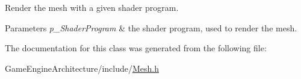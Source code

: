 Render the mesh with a given shader program. 


\begin{DoxyParams}{Parameters}
{\em p\+\_\+\+Shader\+Program} & the shader program, used to render the mesh. \\
\hline
\end{DoxyParams}


The documentation for this class was generated from the following file\+:\begin{DoxyCompactItemize}
\item 
Game\+Engine\+Architecture/include/\mbox{\hyperlink{_mesh_8h}{Mesh.\+h}}\end{DoxyCompactItemize}
